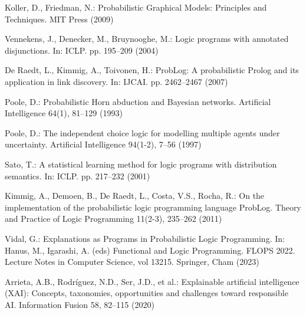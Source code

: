 \begin{singlespace}
\begin{thebibliography}{}
 Koller, D., Friedman, N.: Probabilistic Graphical Models: Principles and Techniques. MIT Press (2009)

 Vennekens, J., Denecker, M., Bruynooghe, M.: Logic programs with annotated disjunctions. In: ICLP. pp. 195--209 (2004)

 De Raedt, L., Kimmig, A., Toivonen, H.: ProbLog: A probabilistic Prolog and its application in link discovery. In: IJCAI. pp. 2462--2467 (2007)

 Poole, D.: Probabilistic Horn abduction and Bayesian networks. Artificial Intelligence 64(1), 81--129 (1993)

 Poole, D.: The independent choice logic for modelling multiple agents under uncertainty. Artificial Intelligence 94(1-2), 7--56 (1997)

 Sato, T.: A statistical learning method for logic programs with distribution semantics. In: ICLP. pp. 217--232 (2001)

 Kimmig, A., Demoen, B., De Raedt, L., Costa, V.S., Rocha, R.: On the implementation of the probabilistic logic programming language ProbLog. Theory and Practice of Logic Programming 11(2-3), 235--262 (2011)

 Vidal, G.: Explanations as Programs in Probabilistic Logic Programming. In: Hanus, M., Igarashi, A. (eds) Functional and Logic Programming. FLOPS 2022. Lecture Notes in Computer Science, vol 13215. Springer, Cham (2023)

 Arrieta, A.B., Rodríguez, N.D., Ser, J.D., et al.: Explainable artificial intelligence (XAI): Concepts, taxonomies, opportunities and challenges toward responsible AI. Information Fusion 58, 82--115 (2020)

\end{thebibliography}

\end{singlespace}
